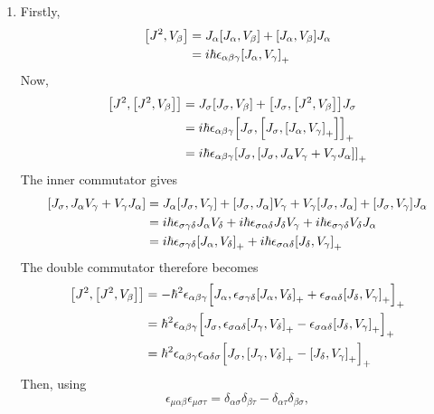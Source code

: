 \documentclass[12pt]{article}
\begin{document}
\begin{enumerate}[label=(\alph*)]
    \item Firstly,
    \begin{align*}
        \comm{J^2}{V_\beta} & = J_\alpha\comm{J_\alpha}{V_\beta} + \comm{J_\alpha}{V_\beta}J_\alpha \\
        &= i\hbar\epsilon_{\alpha\beta\gamma}\comm{J_\alpha}{V_\gamma}_+
    \end{align*}
    Now,
    \begin{align*}
        \comm{J^2}{\comm{J^2}{V_\beta}} &= J_\sigma\comm{J_\sigma}{V_\beta} + \comm{J_\sigma}{\comm{J^2}{V_\beta}}J_\sigma \\
        &= i\hbar\epsilon_{\alpha\beta\gamma}\comm{J_\sigma}{\comm{J_\sigma}{\comm{J_\alpha}{V_\gamma}_+}}_+ \\
        &= i\hbar\epsilon_{\alpha\beta\gamma}\comm{J_\sigma}{\comm{J_\sigma}{J_\alpha V_\gamma + V_\gamma J_\alpha}}_+
    \end{align*}
    The inner commutator gives
    \begin{align*}
        \comm{J_\sigma}{J_\alpha V_\gamma + V_\gamma J_\alpha} &= J_\alpha\comm{J_\sigma}{V_\gamma} + \comm{J_\sigma}{J_\alpha}V_\gamma + V_\gamma\comm{J_\sigma}{J_\alpha} + \comm{J_\sigma}{V_\gamma}J_\alpha \\
        &= i\hbar\epsilon_{\sigma\gamma\delta}J_\alpha V_\delta + i\hbar\epsilon_{\sigma\alpha\delta}J_\delta V_\gamma + i\hbar\epsilon_{\sigma\gamma\delta}V_\delta J_\alpha \\
        &= i\hbar\epsilon_{\sigma\gamma\delta}\comm{J_\alpha}{V_\delta}_+ + i\hbar\epsilon_{\sigma\alpha\delta}\comm{J_\delta}{V_\gamma}_+
    \end{align*}
    The double commutator therefore becomes
    \begin{align*}
        \comm{J^2}{\comm{J^2}{V_\beta}} &= -\hbar^2\epsilon_{\alpha\beta\gamma}\comm{J_\alpha}{\epsilon_{\sigma\gamma\delta}\comm{J_\alpha}{V_\delta}_+ + \epsilon_{\sigma\alpha\delta}\comm{J_\delta}{V_\gamma}_+}_+ \\
        &= \hbar^2\epsilon_{\alpha\beta\gamma}\comm{J_\sigma}{\epsilon_{\sigma\alpha\delta}\comm{J_\gamma}{V_\delta}_+ - \epsilon_{\sigma\alpha\delta}\comm{J_\delta}{V_\gamma}_+}_+ \\
        &= \hbar^2\epsilon_{\alpha\beta\gamma}\epsilon_{\alpha\delta\sigma}\comm{J_\sigma}{\comm{J_\gamma}{V_\delta}_+ - \comm{J_\delta}{V_\gamma}_+}_+
    \end{align*}
    Then, using
    \[ \epsilon_{\mu\alpha\beta}\epsilon_{\mu\sigma\tau} = \delta_{\alpha\sigma}\delta_{\beta\tau} - \delta_{\alpha\tau}\delta_{\beta\sigma}, \]

\end{enumerate}
\end{document}
